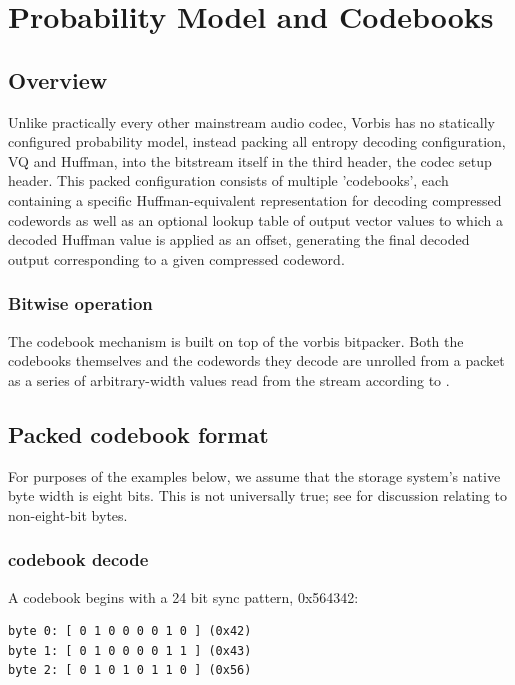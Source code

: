 \section{Probability Model and Codebooks} \label{vorbis:spec:codebook}

\subsection{Overview}

Unlike practically every other mainstream audio codec, Vorbis has no
statically configured probability model, instead packing all entropy
decoding configuration, VQ and Huffman, into the bitstream itself in
the third header, the codec setup header.  This packed configuration
consists of multiple 'codebooks', each containing a specific
Huffman-equivalent representation for decoding compressed codewords as
well as an optional lookup table of output vector values to which a
decoded Huffman value is applied as an offset, generating the final
decoded output corresponding to a given compressed codeword.

\subsubsection{Bitwise operation}
The codebook mechanism is built on top of the vorbis bitpacker. Both
the codebooks themselves and the codewords they decode are unrolled
from a packet as a series of arbitrary-width values read from the
stream according to .




\subsection{Packed codebook format}

For purposes of the examples below, we assume that the storage
system's native byte width is eight bits.  This is not universally
true; see  for discussion
relating to non-eight-bit bytes.

\subsubsection{codebook decode}

A codebook begins with a 24 bit sync pattern, 0x564342:

\begin{Verbatim}[commandchars=\\\{\}]
byte 0: [ 0 1 0 0 0 0 1 0 ] (0x42)
byte 1: [ 0 1 0 0 0 0 1 1 ] (0x43)
byte 2: [ 0 1 0 1 0 1 1 0 ] (0x56)
\end{Verbatim}


